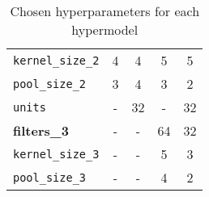 \begin{table}
\begin{subtable}{\textwidth}
\begin{tabular}{lcccc}
            \texttt{kernel\_size\_2} & 4 & 4 & 5 & 5 \\
            \texttt{pool\_size\_2} & 3 & 4 & 3 & 2 \\
            \texttt{units} & - & 32 & - & 32 \\
            \textbf{filters\_3} & - & - & 64 & 32 \\
            \texttt{kernel\_size\_3} & - & - & 5 & 3 \\
            \texttt{pool\_size\_3} & - & - & 4 & 2 \\
        \end{tabular}
        \label{tab:chosenHyperparameters_tuners_augmented}
    \end{subtable}   
    \caption{Chosen hyperparameters for each hypermodel}    
    \label{tab:chosenHyperparameters}

\end{table}






